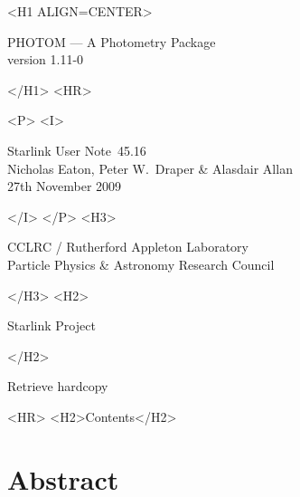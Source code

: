 \documentclass[twoside,11pt]{article}
\newcommand{\stardoccategory}  {Starlink User Note}
\newcommand{\stardocsource}    {sun\stardocnumber}
\newcommand{\stardocnumber}    {45.16}
\newcommand{\stardocauthors}   {Nicholas Eaton, Peter W.\ Draper \& Alasdair Allan}
\newcommand{\stardocdate}      {27th November 2009}
\newcommand{\stardoctitle}     {PHOTOM --- A Photometry Package }
\newcommand{\stardocversion}   {version 1.11-0}
\newcommand{\htmladdnormallink}[2]{#1}
\newcommand{\htmladdimg}[1]{}
\newcommand{\htmlref}[2]{#1}
\newcommand{\htmladdtonavigation}[1]{}
\newcommand{\xlabel}[1]{}
\renewcommand{\_}{\texttt{\symbol{95}}}
\begin{document}
\begin{htmlonly}
   \xlabel{}
   \begin{rawhtml} <H1 ALIGN=CENTER> \end{rawhtml}
      \stardoctitle\\
      \stardocversion

    \htmladdimg{sun45fig.gif}

   \begin{rawhtml} </H1> <HR> \end{rawhtml}

   \begin{rawhtml} <P> <I> \end{rawhtml}
   \stardoccategory\ \stardocnumber \\
   \stardocauthors \\
   \stardocdate
   \begin{rawhtml} </I> </P> <H3> \end{rawhtml}
      \htmladdnormallink{CCLRC}{http://www.cclrc.ac.uk} /
      \htmladdnormallink{Rutherford Appleton Laboratory}
                        {http://www.cclrc.ac.uk/ral} \\
      \htmladdnormallink{Particle Physics \& Astronomy Research Council}
                        {http://www.pparc.ac.uk} \\
   \begin{rawhtml} </H3> <H2> \end{rawhtml}
      \htmladdnormallink{Starlink Project}{http://www.starlink.ac.uk/}
   \begin{rawhtml} </H2> \end{rawhtml}
   \htmladdnormallink{\htmladdimg{source.gif} Retrieve hardcopy}
      {http://www.starlink.ac.uk/cgi-bin/hcserver?\stardocsource}\\

  \label{stardoccontents}
  \begin{rawhtml}
    <HR>
    <H2>Contents</H2>
  \end{rawhtml}
  \htmladdtonavigation{\htmlref{\htmladdimg{contents_motif.gif}}
        {stardoccontents}}

  \section{\xlabel{abstract}Abstract}
\end{htmlonly}
\end{document}
